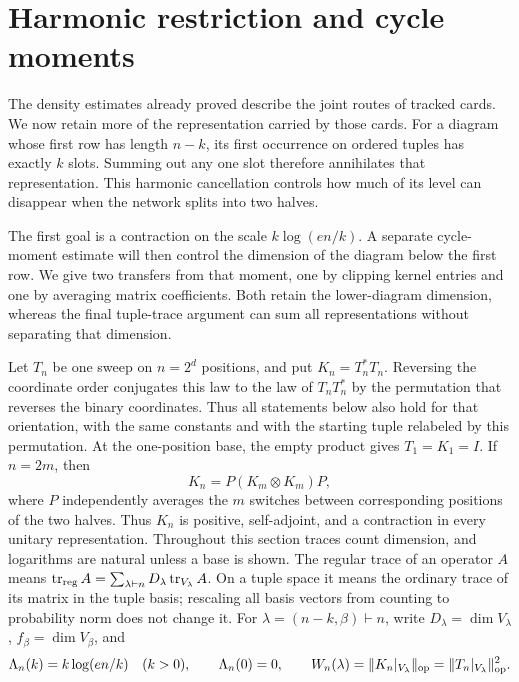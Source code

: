 \section{Harmonic restriction and cycle moments}
\label{rec:sec-harmonic}

The density estimates already proved describe the joint routes of tracked
cards.  We now retain more of the representation carried by those cards.
For a diagram whose first row has length $n-k$, its first occurrence on
ordered tuples has exactly $k$ slots.  Summing out any one slot therefore
annihilates that representation.  This harmonic cancellation controls how
much of its level can disappear when the network splits into two halves.

The first goal is a contraction on the scale $k\log(en/k)$.  A separate
cycle-moment estimate will then control the dimension of the diagram below
the first row.  We give two transfers from that moment, one by clipping
kernel entries and one by averaging matrix coefficients.  Both retain the
lower-diagram dimension, whereas the final tuple-trace argument can sum all
representations without separating that dimension.

Let $T_n$ be one sweep on $n=2^d$ positions, and put $K_n=T_n^*T_n$.
Reversing the coordinate order conjugates this law to the law of
$T_nT_n^*$ by the permutation that reverses the binary coordinates.  Thus
all statements below also hold for that orientation, with the same
constants and with the starting tuple relabeled by this permutation.
At the one-position base, the empty product gives $T_1=K_1=I$.
If $n=2m$, then
\begin{equation}\label{rec:network-recursion}
 K_n=P(K_m\otimes K_m)P,
\end{equation}
where $P$ independently averages the $m$ switches between corresponding
positions of the two halves.  Thus $K_n$ is positive, self-adjoint, and a
contraction in every unitary representation.  Throughout this section
traces count dimension, and logarithms are natural unless a base is shown.
The regular trace of an operator $A$ means
$\operatorname{tr}_{\rm reg}A=\sum_{\lambda\vdash n}D_\lambda
\operatorname{tr}_{V_\lambda}A$.  On a tuple space it means the ordinary
trace of its matrix in the tuple basis; rescaling all basis vectors from
counting to probability norm does not change it.
For $\lambda=(n-k,\beta)\vdash n$, write $D_\lambda=\dim V_\lambda$,
$f_\beta=\dim V_\beta$, and
\[
 \Lambda_n(k)=k\log(en/k)\quad(k>0),\qquad\Lambda_n(0)=0,\qquad
 W_n(\lambda)=\|K_n|_{V_\lambda}\|_{\mathrm{op}}
              =\|T_n|_{V_\lambda}\|_{\mathrm{op}}^{2}.
\]

